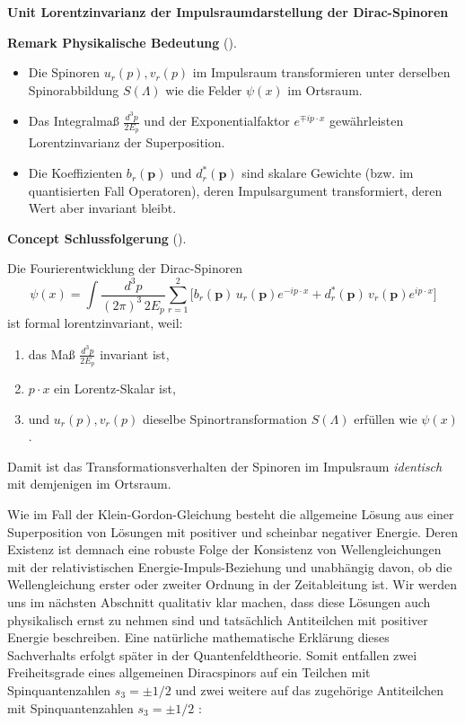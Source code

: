 \documentclass[10pt, letterpaper]{article}
\newcommand{\CustomHeading}[3]{%
  \par\medskip\noindent%
  \textbf{#1 #2} \textnormal{(#3)}.\enskip%
}
\newenvironment{REM}[2]{\begin{unitbox}\CustomHeading{Remark}{#1}{#2}}{\end{unitbox}}
\newenvironment{CONC}[2]{\begin{unitbox}\CustomHeading{Concept}{#1}{#2}}{\end{unitbox}}
\newenvironment{unit}[1]
  {\begin{unitbox}\textbf{Unit #1}\par\smallskip}
  {\end{unitbox}}
\begin{document}
\begin{unit}{Lorentzinvarianz der Impulsraumdarstellung der Dirac-Spinoren}
\begin{REM}{Physikalische Bedeutung}{}
\begin{itemize}
\item Die Spinoren $u_r(p),v_r(p)$ im Impulsraum transformieren unter derselben Spinorabbildung $S(\Lambda)$ wie die Felder $\psi(x)$ im Ortsraum.
\item Das Integralmaß $\frac{d^3p}{2E_p}$ und der Exponentialfaktor $e^{\mp i p\cdot x}$ gewährleisten Lorentzinvarianz der Superposition.
\item Die Koeffizienten $b_r(\mathbf p)$ und $d_r^*(\mathbf p)$ sind skalare Gewichte (bzw. im quantisierten Fall Operatoren), deren Impulsargument transformiert, deren Wert aber invariant bleibt.
\end{itemize}
\end{REM}

\begin{CONC}{Schlussfolgerung}{}
Die Fourierentwicklung der Dirac-Spinoren
\[
\psi(x)
=\int\!\frac{d^3p}{(2\pi)^3\,2E_p}
\sum_{r=1}^2
\big[b_r(\mathbf p)\,u_r(\mathbf p)e^{-ip\cdot x}
+d_r^*(\mathbf p)\,v_r(\mathbf p)e^{ip\cdot x}\big]
\]
ist formal lorentzinvariant, weil:
\begin{enumerate}[label=\roman*)]
\item das Maß $\frac{d^3p}{2E_p}$ invariant ist,
\item $p\!\cdot\!x$ ein Lorentz-Skalar ist,
\item und $u_r(p),v_r(p)$ dieselbe Spinortransformation $S(\Lambda)$ erfüllen wie $\psi(x)$.
\end{enumerate}
Damit ist das Transformationsverhalten der Spinoren im Impulsraum \emph{identisch} mit demjenigen im Ortsraum.
\end{CONC}

\end{unit}


Wie im Fall der Klein-Gordon-Gleichung besteht die allgemeine Lösung aus einer Superposition von Lösungen mit positiver und scheinbar negativer Energie. Deren Existenz ist demnach eine robuste Folge der Konsistenz von Wellengleichungen mit der relativistischen Energie-Impuls-Beziehung und unabhängig davon, ob die Wellengleichung erster oder zweiter Ordnung in der Zeitableitung ist. Wir werden uns im nächsten Abschnitt qualitativ klar machen, dass diese Lösungen auch physikalisch ernst zu nehmen sind und tatsächlich Antiteilchen mit positiver Energie beschreiben. Eine natürliche mathematische Erklärung dieses Sachverhalts erfolgt später in der Quantenfeldtheorie. Somit entfallen zwei Freiheitsgrade eines allgemeinen Diracspinors auf ein Teilchen mit Spinquantenzahlen $s_{3}= \pm 1 / 2$ und zwei weitere auf das zugehörige Antiteilchen mit Spinquantenzahlen $s_{3}= \pm 1 / 2$ :
\end{document}
